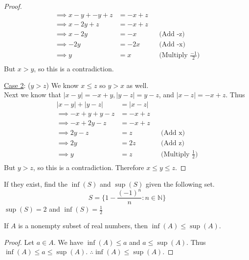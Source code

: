 \documentclass[12pt]{article}
\begin{document}
\begin{enumerate}
\begin{proof}
\begin{align*}
			      \implies x-y + -y+z & = -x+z                                        \\
			      \implies x -2y + z  & = -x+z                                        \\
			      \implies x -2y      & = -x    &  & \text{(Add -z)}                  \\
			      \implies -2y        & = -2x   &  & \text{(Add -x)}                  \\
			      \implies y          & = x     &  & \text{(Multiply $\frac{-1}{2}$)} \\
		      \end{align*}
		      But $x > y$, so this is a contradiction.
		      \item[\underline{Case 2}: ($y > z$)] We know $x \leq z$ so $y > x$ as well. \\
		      Next we know that $|x-y| = -x+y, |y-z| = y-z$, and $|x-z| = -x+z$. Thus
		      \begin{align*}
			      |x-y|+|y-z|          & = |x-z|                                      \\
			      \implies -x+y + y-z  & = -x+z                                       \\
			      \implies -x + 2y - z & = -x+z                                       \\
			      \implies 2y - z      & = z     &  & \text{(Add x)}                  \\
			      \implies 2y          & = 2z    &  & \text{(Add z)}                  \\
			      \implies y           & = z     &  & \text{(Multiply $\frac{1}{2}$)} \\
		      \end{align*}
		      But $y > z$, so this is a contradiction. Therefore $x \leq y \leq z$.
	      \end{proof}
	\item If they exist, find the $\inf (S)$ and $\sup (S)$ given the following set.
	      \begin{equation*}
		      S= \bigg\{1-\frac{(-1)^n}{n}: n \in \mathbb{N} \bigg\}
	      \end{equation*}
	      $\sup (S) = 2$ and $\inf (S) = \frac{1}{2}$
	\item If $A$ is a nonempty subset of real numbers, then $\inf (A) \leq \sup (A)$.
	      \begin{proof} Let $a \in A$. We have $\inf (A) \leq a$ and $a \leq \sup (A)$. Thus $\inf (A) \leq a \leq \sup (A)$.
		      $\therefore \inf (A) \leq \sup (A)$.

\end{proof}
\end{enumerate}
\end{document}
